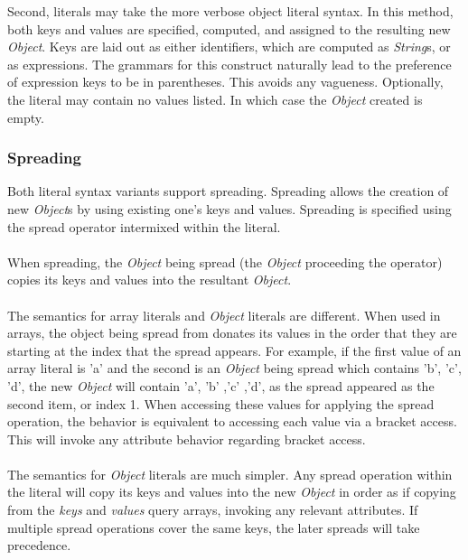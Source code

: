 \documentclass[12pt,letterpaper]{report}
\begin{document}


Second, literals may take the more verbose object literal syntax. In this method, both 
keys and values are specified, computed, and assigned to the resulting new \textit{Object}.
Keys are laid out as either identifiers, which are computed as \textit{String}s, or 
as expressions. The grammars for this construct naturally lead to the preference of 
expression keys to be in parentheses. This avoids any vagueness.
Optionally, the literal may contain no values listed. In which case the \textit{Object} created is empty.




\subsubsection{Spreading}\label{Spreading}

Both literal syntax variants support spreading. Spreading allows the creation 
of new \textit{Object}s by using existing one's keys and values. Spreading is 
specified using the spread operator intermixed within the literal.
\\\\
When spreading, the \textit{Object} being spread (the \textit{Object} proceeding the operator)
copies its keys and values into the resultant \textit{Object}.
\\\\
The semantics for array literals and \textit{Object} literals are different.
When used in arrays, the object being spread from donates its values in the order 
that they are starting at the index that the spread appears. For example, 
if the first value of an array literal is 'a' and the second is an \textit{Object} 
being spread which contains 'b', 'c', 'd', the new \textit{Object} will contain 
'a', 'b' ,'c' ,'d', as the spread appeared as the second item, or index 1.
When accessing these values for applying the spread operation, the behavior is 
equivalent to accessing each value via a bracket access. This will invoke 
any attribute behavior regarding bracket access.
\\\\
The semantics for \textit{Object} literals are much simpler. Any spread operation 
within the literal will copy its keys and values into the new \textit{Object}
in order as if copying from the \textit{keys} and \textit{values} query arrays, invoking any relevant attributes.
If multiple spread operations cover the same keys, the later spreads will take precedence.
\end{document}
